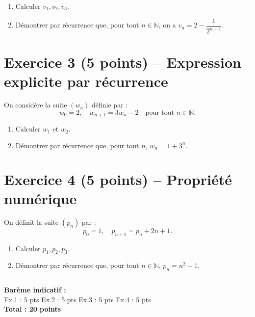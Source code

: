 \documentclass[12pt,a4paper]{article}
\begin{document}
\begin{enumerate}
    \item Calculer $v_1, v_2, v_3$.
    \item Démontrer par récurrence que, pour tout $n \in \mathbb{N}$, on a $v_n =2-\dfrac{1}{2^{n-1}}$.
\end{enumerate}

\vspace{0.5cm}

\section*{Exercice 3 (5 points) -- Expression explicite par récurrence}
On considère la suite $(w_n)$ définie par :
\[
w_0 = 2, \quad w_{n+1} = 3w_n - 2 \quad \text{pour tout } n \in \mathbb{N}.
\]

\begin{enumerate}
    \item Calculer $w_1$ et $w_2$.
    \item Démontrer par récurrence que, pour tout $n$, $w_n = 1+ 3^n$.
\end{enumerate}

\vspace{0.5cm}

\section*{Exercice 4 (5 points) -- Propriété numérique}
On définit la suite $(p_n)$ par :
\[
p_0 = 1, \quad p_{n+1} = p_n + 2n + 1.
\]

\begin{enumerate}
    \item Calculer $p_1, p_2, p_3$.
    \item Démontrer par récurrence que, pour tout $n \in \mathbb{N}$, $p_n = n^2+1$.
\end{enumerate}

\vspace{0.8cm}
\hrule
\vspace{0.3cm}

\noindent\textbf{Barème indicatif :}\\
Ex.1 : 5 pts \quad Ex.2 : 5 pts \quad Ex.3 : 5 pts \quad Ex.4 : 5 pts \\
\textbf{Total : 20 points}
\end{document}
